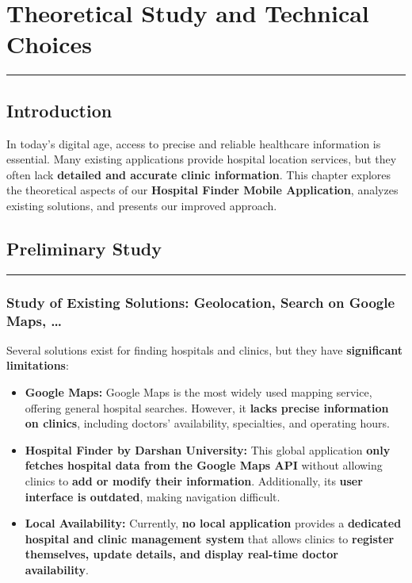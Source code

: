 \documentclass[12pt]{report}
\begin{document}
\newpage

\chapter{\textbf{Theoretical Study and Technical Choices}}
\rule{\linewidth}{1.5pt}


\section{\textbf{Introduction}}

In today's digital age, access to precise and reliable healthcare information is essential. Many existing applications provide hospital location services, but they often lack \textbf{detailed and accurate clinic information}.
This chapter explores the theoretical aspects of our \textbf{Hospital Finder Mobile Application}, analyzes existing solutions, and presents our improved approach.

\section{\textbf{Preliminary Study}}
\vspace{-0.5cm}
\rule{7.5cm}{1.5pt}
\vspace{-0.5cm}
\subsection{\textbf{Study of Existing Solutions: Geolocation, Search on Google Maps, …}}

Several solutions exist for finding hospitals and clinics, but they have \textbf{significant limitations}:

\begin{itemize}
	\item \textbf{Google Maps:}
	      Google Maps is the most widely used mapping service, offering general hospital searches. However, it \textbf{lacks precise information on clinics}, including doctors' availability, specialties, and operating hours.
	\item \textbf{Hospital Finder by Darshan University:}
	      This global application \textbf{only fetches hospital data from the Google Maps API} without allowing clinics to \textbf{add or modify their information}. Additionally, its \textbf{user interface is outdated}, making navigation difficult.
	\item \textbf{Local Availability:}
	      Currently, \textbf{no local application} provides a \textbf{dedicated hospital and clinic management system} that allows clinics to \textbf{register themselves, update details, and display real-time doctor availability}.
\end{itemize}
\end{document}
